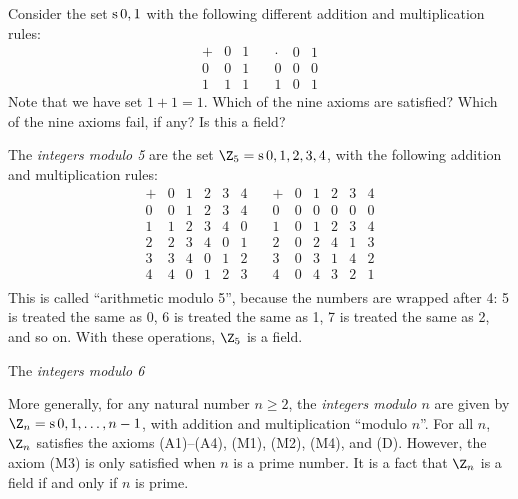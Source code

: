 {\begin{nproblem}
  Consider the set $\mathop{\textrm{s}}\nolimits{0,1}$ with the following different addition and
  multiplication rules:
  \[ \begin{array}{l|ll}
    +&0&1 \\\hline
    0&0&1 \\
    1&1&1
  \end{array}
  \quad
  \begin{array}{l|ll}
    \cdot&0&1 \\\hline
    0&0&0 \\
    1&0&1
  \end{array}
  \]
  Note that we have set $1+1=1$. Which of the nine axioms are
  satisfied? Which of the nine axioms fail, if any? Is this a field?
\end{nproblem}

\begin{example}
  The {\em integers modulo 5} are the set $\Z_5=\s{0,1,2,3,4}$, with
  the following addition and multiplication rules:
    \[ \begin{array}{l|lllll}
    +&0&1&2&3&4 \\\hline
    0&0&1&2&3&4 \\
    1&1&2&3&4&0 \\
    2&2&3&4&0&1 \\
    3&3&4&0&1&2 \\
    4&4&0&1&2&3 \\
  \end{array}
  \quad
  \begin{array}{l|lllll}
    +&0&1&2&3&4 \\\hline
    0&0&0&0&0&0 \\
    1&0&1&2&3&4 \\
    2&0&2&4&1&3 \\
    3&0&3&1&4&2 \\
    4&0&4&3&2&1 \\
  \end{array}
  \]
  This is called ``arithmetic modulo 5'', because the numbers are
  wrapped after 4: 5 is treated the same as 0, 6 is treated the same
  as 1, 7 is treated the same as 2, and so on. With these operations,
  $\Z_5$ is a field.
\end{example}

\begin{example}
  The {\em integers modulo 6}
\end{example}

\begin{example}
  More generally, for any natural number $n\geq 2$, the {\em integers
    modulo $n$} are given by $\Z_n=\s{0,1,\ldots,n-1}$, with addition
  and multiplication ``modulo $n$''. For all $n$, $\Z_n$ satisfies the
  axioms (A1)--(A4), (M1), (M2), (M4), and (D).  However, the axiom
  (M3) is only satisfied when $n$ is a prime number. It is a fact
  that $\Z_n$ is a field if and only if $n$ is prime.
\end{example}

}
